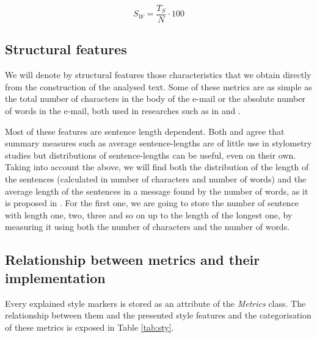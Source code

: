 $$
S_W = \frac{T_S}{N}\cdot 100
$$

\subsection{Structural features}\label{ssect:strucf}

We will denote by structural features those characteristics that we obtain directly from the construction of the analysed text. Some of these metrics are as simple as the total number of characters in the body of the e-mail or the absolute number of words in the e-mail, both used in researches such as in \cite{corney2001identifying} and \cite{ril2014determination}.

Most of these features are sentence length dependent. Both \cite{tallentire1972appraisal} and \cite{kjetsaa1979and} agree that summary measures such as average sentence-lengths are of little use in stylometry studies but distributions of sentence-lengths can be useful, even on their own. Taking into account the above, we will find both the distribution of the length of the sentences (calculated in number of characters and number of words) and the average length of the sentences in a message found by the number of words, as it is proposed in \cite{corney2001identifying}. For the first one, we are going to store the number of sentence with length one, two, three and so on up to the length of the longest one, by measuring it  using both the number of characters and the number of words.

\subsection{Relationship between metrics and their implementation}\label{ssect:relmet}
Every explained style markers is stored as an attribute of the \textit{Metrics} class. The relationship between them and the presented style features and the categorisation of these metrics is exposed in Table \ref{tab:sty}.

